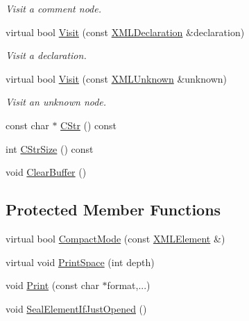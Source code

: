 \begin{DoxyCompactItemize}
\begin{DoxyCompactList}\small\item\em Visit a comment node. \end{DoxyCompactList}\item 
virtual bool \hyperlink{classtinyxml2_1_1_x_m_l_printer_acfc625b2549304b9c7eb85ebd5c5eb39}{Visit} (const \hyperlink{classtinyxml2_1_1_x_m_l_declaration}{X\+M\+L\+Declaration} \&declaration)
\begin{DoxyCompactList}\small\item\em Visit a declaration. \end{DoxyCompactList}\item 
virtual bool \hyperlink{classtinyxml2_1_1_x_m_l_printer_ab8af5455bbf9e4be2663e6642fcd7e32}{Visit} (const \hyperlink{classtinyxml2_1_1_x_m_l_unknown}{X\+M\+L\+Unknown} \&unknown)
\begin{DoxyCompactList}\small\item\em Visit an unknown node. \end{DoxyCompactList}\item 
const char $\ast$ \hyperlink{classtinyxml2_1_1_x_m_l_printer_a4a1b788e11b540921ec50687cd2b24a9}{C\+Str} () const 
\item 
int \hyperlink{classtinyxml2_1_1_x_m_l_printer_a02c3c5f8c6c007dcbaf10595d9e22bf0}{C\+Str\+Size} () const 
\item 
void \hyperlink{classtinyxml2_1_1_x_m_l_printer_a216157765b7267bf389975b1cbf9a909}{Clear\+Buffer} ()
\end{DoxyCompactItemize}
\subsection*{Protected Member Functions}
\begin{DoxyCompactItemize}
\item 
virtual bool \hyperlink{classtinyxml2_1_1_x_m_l_printer_a38e1ed5a779bdf63eda9e808f7a6de66}{Compact\+Mode} (const \hyperlink{classtinyxml2_1_1_x_m_l_element}{X\+M\+L\+Element} \&)
\item 
virtual void \hyperlink{classtinyxml2_1_1_x_m_l_printer_a1c4b2ccbe4fdb316d54f5a93f3559260}{Print\+Space} (int depth)
\item 
void \hyperlink{classtinyxml2_1_1_x_m_l_printer_ab30210a7f32e45634e7a45137bf6fdf6}{Print} (const char $\ast$format,...)
\item 
void \hyperlink{classtinyxml2_1_1_x_m_l_printer_ac6e2c72c5d796f5b4de6ce81ca95e3fa}{Seal\+Element\+If\+Just\+Opened} ()
\end{DoxyCompactItemize}
